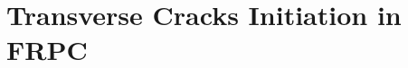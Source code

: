 \documentclass[first,firstsupp,lastsupp,last,hyperref,table]{ETHclass}
\begin{document}
\section{Transverse Cracks Initiation in FRPC}

%
%
\end{document}
